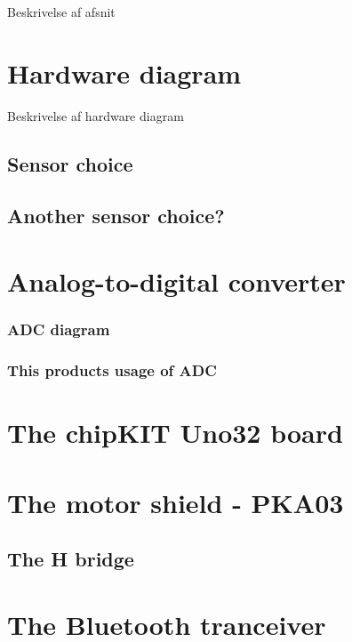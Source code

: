 Beskrivelse af afsnit

\section{Hardware diagram}
Beskrivelse af hardware diagram


\subsection{Sensor choice}


\subsection{Another sensor choice?}

\section{Analog-to-digital converter}


\subsubsection{ADC diagram} 

\subsubsection{This products usage of ADC}

\section{The chipKIT Uno32 board}


\section{The motor shield - PKA03}

\subsection{The H bridge}


\section{The Bluetooth tranceiver}

